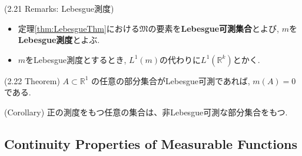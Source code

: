 \documentclass[a4paper]{jsarticle}
\begin{document}
\begin{defi}{(2.21 Remarks: Lebesgue測度)}{}
    \begin{itemize}
        \item 定理\ref{thm:LebesgueThm}における$\mathfrak{M}$の要素を{\bf Lebesgue可測集合}とよび, $m$を{\bf Lebesgue測度}とよぶ.
        \item $m$をLebesgue測度とするとき, $L^1(m)$の代わりに$L^1(\mathbb{R}^k)$とかく.
    \end{itemize}
\end{defi}

\begin{thm}{(2.22 Theorem)}{}
    \( A \subset \mathbb{R}^1 \) の任意の部分集合がLebesgue可測であれば, \( m(A)=0 \)である.
\end{thm}
\begin{cor}{(Corollary)}{}
    正の測度をもつ任意の集合は、非Lebesgue可測な部分集合をもつ.
\end{cor}

\subsection{Continuity Properties of Measurable Functions}
\end{document}
